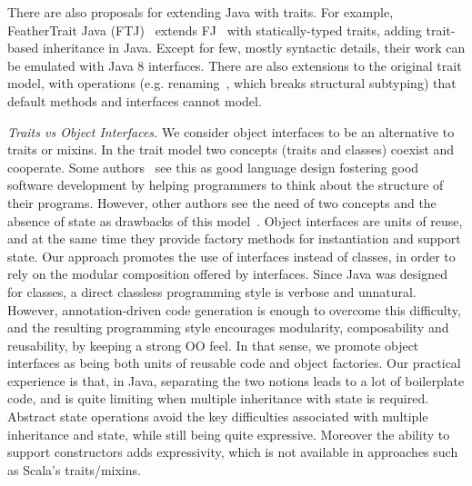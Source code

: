 There are also proposals for extending Java with traits. For
example, FeatherTrait Java (FTJ)~\cite{Liquori08ftj} extends
FJ~\cite{Igarashi01FJ} with statically-typed traits, adding trait-based
inheritance in Java.  Except for few, mostly syntactic details, their work can
be emulated with Java 8 interfaces. There are also extensions to the original
trait model, with operations (e.g. renaming~\cite{reppy2006foundation}, which breaks
structural subtyping) that default methods and interfaces cannot
model.

\emph{Traits vs Object Interfaces.}
We consider object interfaces to be an alternative to traits or mixins.  In the
trait model two concepts (traits and classes) coexist and cooperate. Some
authors~\cite{BettiniDSS13} see this as good language design fostering good
software development by helping programmers to think about the structure of
their programs.  However, other authors see the need of two concepts and the
absence of state as drawbacks of this model~\cite{malayeri2009cz}.  Object
interfaces are units of reuse, and at the same time they provide factory methods
for instantiation and support state.  Our approach promotes the use of
interfaces instead of classes, in order to rely on the modular composition
offered by interfaces. Since Java was designed for classes, a direct classless
programming style is verbose and unnatural. However, annotation-driven code
generation is enough to overcome this difficulty, and the resulting programming
style encourages modularity, composability and reusability, by keeping a strong
OO feel. In that sense, we promote object interfaces as being both units of
reusable code and object factories. Our practical experience is that, in Java,
separating the two notions leads to a lot of boilerplate code, and is quite
limiting when multiple inheritance with state is required.  Abstract state
operations avoid the key difficulties associated with multiple inheritance and
state, while still being quite expressive.  Moreover the ability to support
constructors adds expressivity, which is not available in approaches
such as Scala's traits/mixins.





